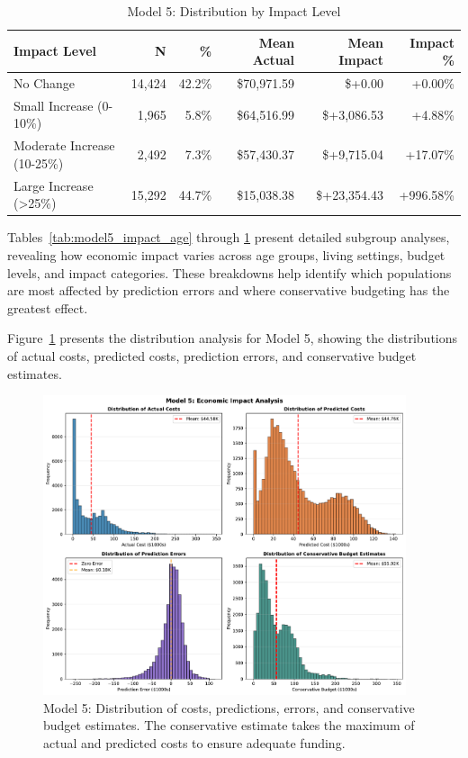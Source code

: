\begin{table}[htbp]
\centering
\small
\caption{Model 5: Distribution by Impact Level}
\label{tab:model5_impact_distribution}
\begin{tabular}{lrrrrr}
\toprule
\textbf{Impact Level} & \textbf{N} & \textbf{\%} & \textbf{Mean Actual} & \textbf{Mean Impact} & \textbf{Impact \%} \\
\midrule
No Change & 14,424 & 42.2\% & \$70,971.59 & \$+0.00 & +0.00\% \\
Small Increase (0-10\%) & 1,965 & 5.8\% & \$64,516.99 & \$+3,086.53 & +4.88\% \\
Moderate Increase (10-25\%) & 2,492 & 7.3\% & \$57,430.37 & \$+9,715.04 & +17.07\% \\
Large Increase (>25\%) & 15,292 & 44.7\% & \$15,038.38 & \$+23,354.43 & +996.58\% \\
\bottomrule
\end{tabular}
\end{table}

Tables~\ref{tab:model5_impact_age} through \ref{tab:model5_impact_distribution} present detailed subgroup analyses, revealing how economic impact varies across age groups, living settings, budget levels, and impact categories. These breakdowns help identify which populations are most affected by prediction errors and where conservative budgeting has the greatest effect.

Figure~\ref{fig:model5_impact_histograms} presents the distribution analysis for Model 5, showing the distributions of actual costs, predicted costs, prediction errors, and conservative budget estimates.

\begin{figure}[htbp]
\centering
\includegraphics[width=0.95\textwidth]{figures/model_5_Impact_Histograms.pdf}
\caption{Model 5: Distribution of costs, predictions, errors, and conservative budget estimates. The conservative estimate takes the maximum of actual and predicted costs to ensure adequate funding.}
\label{fig:model5_impact_histograms}
\end{figure}

